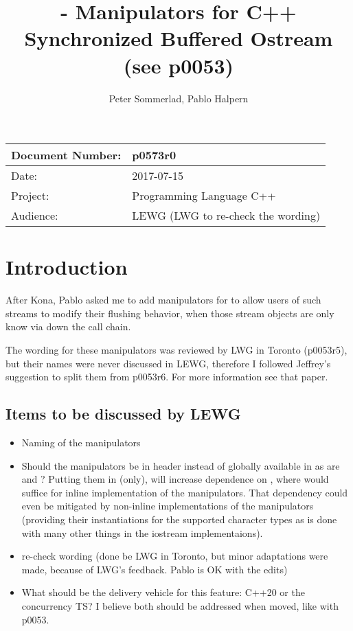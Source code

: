 \documentclass[ebook,11pt,article]{memoir}
\title{\papernumber{} - Manipulators for C++ Synchronized Buffered Ostream (see p0053)}
\author{Peter Sommerlad, Pablo Halpern}
\date{\paperdate}                %
\newcommand{\papernumber}{p0573r0}
\newcommand{\paperdate}{2017-07-15}
\begin{document}
\maketitle
\begin{center}
\begin{tabular}[t]{|l|l|}\hline 
Document Number:&  \papernumber \\\hline
Date: & \paperdate \\\hline
Project: & Programming Language C++\\\hline 
Audience: & LEWG (LWG to re-check the wording)\\\hline
\end{tabular}
\end{center}
\chapter{Introduction}
After Kona, Pablo asked me to add  manipulators for  to allow users of such streams to modify their flushing behavior, when those stream objects are only know via  down the call chain.

The wording for these manipulators was reviewed by LWG in Toronto (p0053r5), but their names were never discussed in LEWG, therefore I followed Jeffrey's suggestion to split them from p0053r6. For more information see that paper.


\section{Items to be discussed by LEWG}
\begin{itemize}
\item Naming of the manipulators
\item Should the manipulators be in header  instead of globally available in  as are  and ? Putting them in  (only), will increase dependence on , where  would suffice for inline implementation of the manipulators. That dependency could even be mitigated by non-inline implementations of the manipulators (providing their instantiations for the supported character types as is done with many other things in the iostream implementaions).
\item re-check wording (done be LWG in Toronto, but minor adaptations were made, because of LWG's feedback. Pablo is OK with the edits)
\item What should be the delivery vehicle for this feature: C++20 or the concurrency TS? I believe both should be addressed when moved, like with p0053.
\end{itemize}
\end{document}
